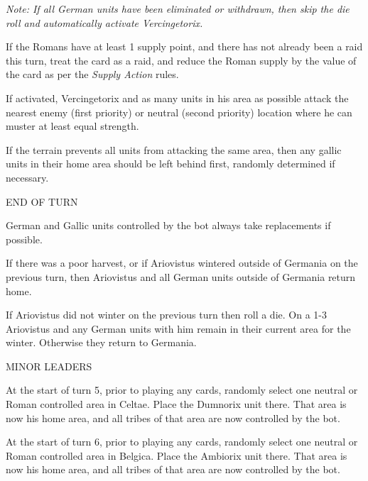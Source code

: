 \textit{Note: If all German units have been eliminated or withdrawn, then skip the die roll and automatically activate Vercingetorix.}
    
If the Romans have at least 1 supply point, and there has not already been a raid this turn, treat the card as a raid, and reduce the Roman supply by the value of the card as per the \textit{Supply Action} rules.
    
If activated, Vercingetorix and as many units in his area as possible attack the nearest enemy (first priority) or neutral (second priority) location where he can muster at least equal strength.
    
If the terrain prevents all units from attacking the same area, then any gallic units in their home area should be left behind first, randomly determined if necessary.
  
\label{solitaire:end_of_turn}END OF TURN

German and Gallic units controlled by the bot always take replacements if possible.

If there was a poor harvest, or if Ariovistus wintered outside of Germania on the previous turn, then Ariovistus and all German units outside of Germania return home.
    
If Ariovistus did not winter on the previous turn then roll a die. On a 1-3 Ariovistus and any German units with him remain in their current area for the winter. Otherwise they return to Germania.

\label{solitaire:minor_leaders}MINOR LEADERS

At the start of turn 5, prior to playing any cards, randomly select one neutral or Roman controlled area in Celtae. Place the Dumnorix unit there. That area is now his home area, and all tribes of that area are now controlled by the bot.

At the start of turn 6, prior to playing any cards, randomly select one neutral or Roman controlled area in Belgica. Place the Ambiorix unit there. That area is now his home area, and all tribes of that area are now controlled by the bot.

